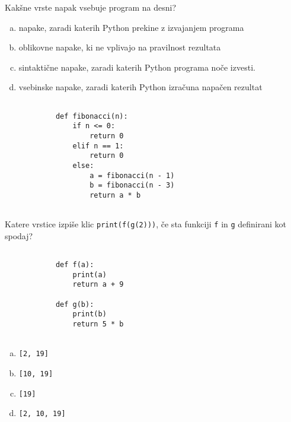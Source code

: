 \documentclass[arhiv, 10pt]{../izpit}
\newcommand{\inlinepy}[1]{\texttt{#1}}
\begin{document}
        \naloga*
        \begin{multicols}{2}
        \noindent
        Kakšne vrste napak vsebuje program na desni?

        \begin{enumerate}[(a)]
\item napake, zaradi katerih Python prekine z izvajanjem programa
\item oblikovne napake, ki ne vplivajo na pravilnost rezultata
\item sintaktične napake, zaradi katerih Python programa noče izvesti.
\item vsebinske napake, zaradi katerih Python izračuna napačen rezultat
\end{enumerate}

        \columnbreak

        \begin{verbatim}
        
            def fibonacci(n):
                if n <= 0:
                    return 0
                elif n == 1:
                    return 0
                else:
                    a = fibonacci(n - 1)
                    b = fibonacci(n - 3)
                    return a * b
            
        \end{verbatim}

        \end{multicols}

    
        \naloga*
        Katere vrstice izpiše klic \inlinepy{print(f(g(2)))}, če sta funkciji \inlinepy{f} in \inlinepy{g} definirani kot spodaj?

        \begin{multicols}{2}
        \begin{verbatim}
        
            def f(a):
                print(a)
                return a + 9

            def g(b):
                print(b)
                return 5 * b
        
        \end{verbatim}

        \begin{enumerate}[(a)]
\item \inlinepy{[2, 19]}
\item \inlinepy{[10, 19]}
\item \inlinepy{[19]}
\item \inlinepy{[2, 10, 19]}
\end{enumerate}

        \end{multicols}
    
\end{document}
